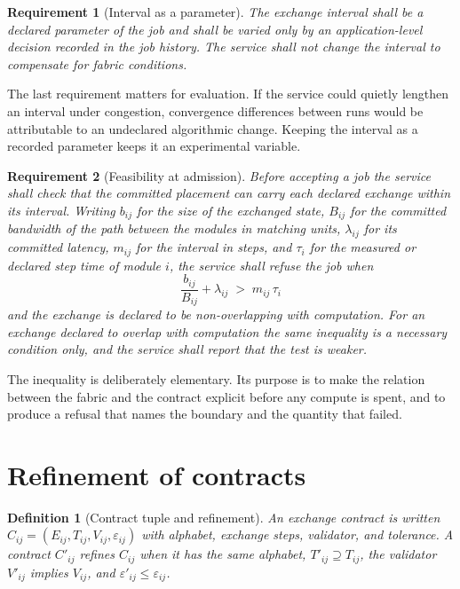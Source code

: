 \documentclass[11pt,openany]{book}
\newtheorem{definition}{Definition}[chapter]
\newtheorem{requirement}{Requirement}[chapter]
\theoremstyle{remark}
\begin{document}
\begin{requirement}[Interval as a parameter]
The exchange interval shall be a declared parameter of the job and shall be varied only by an application-level decision recorded in the job history. The service shall not change the interval to compensate for fabric conditions.
\end{requirement}

The last requirement matters for evaluation. If the service could quietly lengthen an interval under congestion, convergence differences between runs would be attributable to an undeclared algorithmic change. Keeping the interval as a recorded parameter keeps it an experimental variable.

\begin{requirement}[Feasibility at admission]
Before accepting a job the service shall check that the committed placement can carry each declared exchange within its interval. Writing $b_{ij}$ for the size of the exchanged state, $B_{ij}$ for the committed bandwidth of the path between the modules in matching units, $\lambda_{ij}$ for its committed latency, $m_{ij}$ for the interval in steps, and $\tau_i$ for the measured or declared step time of module $i$, the service shall refuse the job when
\[
\frac{b_{ij}}{B_{ij}}+\lambda_{ij}\;>\;m_{ij}\,\tau_i
\]
and the exchange is declared to be non-overlapping with computation. For an exchange declared to overlap with computation the same inequality is a necessary condition only, and the service shall report that the test is weaker.
\end{requirement}

The inequality is deliberately elementary. Its purpose is to make the relation between the fabric and the contract explicit before any compute is spent, and to produce a refusal that names the boundary and the quantity that failed.

\section{Refinement of contracts}

\begin{definition}[Contract tuple and refinement]
An exchange contract is written $C_{ij}=(E_{ij},T_{ij},V_{ij},\varepsilon_{ij})$ with alphabet, exchange steps, validator, and tolerance. A contract $C'_{ij}$ refines $C_{ij}$ when it has the same alphabet, $T'_{ij}\supseteq T_{ij}$, the validator $V'_{ij}$ implies $V_{ij}$, and $\varepsilon'_{ij}\le\varepsilon_{ij}$.
\end{definition}
\end{document}
